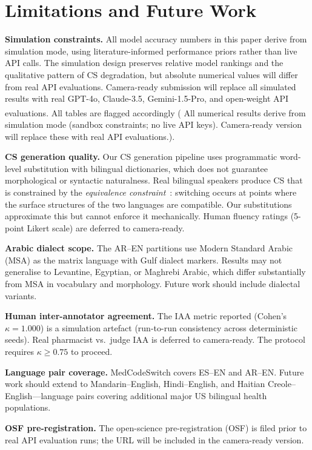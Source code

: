 \documentclass[3p,times,procedia]{elsarticle}
\newcommand{\simtext}{%
  \textsuperscript{\textdagger}All numerical results derive from
  simulation mode (sandbox constraints; no live API keys). Camera-ready
  version will replace these with real API evaluations.}
\begin{document}
\section{Limitations and Future Work}
\label{sec:limitations}

\textbf{Simulation constraints.}
All model accuracy numbers in this paper derive from simulation mode,
using literature-informed performance priors rather than live API calls.
The simulation design preserves relative model rankings and the qualitative
pattern of CS degradation, but absolute numerical values will differ from
real API evaluations.
Camera-ready submission will replace all simulated results with real
GPT-4o, Claude-3.5, Gemini-1.5-Pro, and open-weight API evaluations.
All tables are flagged accordingly (\simtext).

\textbf{CS generation quality.}
Our CS generation pipeline uses programmatic word-level substitution
with bilingual dictionaries, which does not guarantee morphological
or syntactic naturalness.
Real bilingual speakers produce CS that is constrained by the
\emph{equivalence constraint}~\cite{Poplack1980}: switching occurs at
points where the surface structures of the two languages are compatible.
Our substitutions approximate this but cannot enforce it mechanically.
Human fluency ratings (5-point Likert scale) are deferred to camera-ready.

\textbf{Arabic dialect scope.}
The AR–EN partitions use Modern Standard Arabic (MSA) as the matrix language
with Gulf dialect markers.
Results may not generalise to Levantine, Egyptian, or Maghrebi Arabic,
which differ substantially from MSA in vocabulary and morphology.
Future work should include dialectal variants.

\textbf{Human inter-annotator agreement.}
The IAA metric reported (Cohen's $\kappa = 1.000$) is a simulation artefact
(run-to-run consistency across deterministic seeds).
Real pharmacist vs.\ judge IAA is deferred to camera-ready.
The protocol requires $\kappa \geq 0.75$ to proceed.

\textbf{Language pair coverage.}
MedCodeSwitch covers ES–EN and AR–EN.
Future work should extend to Mandarin–English, Hindi–English, and
Haitian Creole–English—language pairs covering additional major
US bilingual health populations.

\textbf{OSF pre-registration.}
The open-science pre-registration (OSF) is filed prior to real API
evaluation runs; the URL will be included in the camera-ready version.
\end{document}
